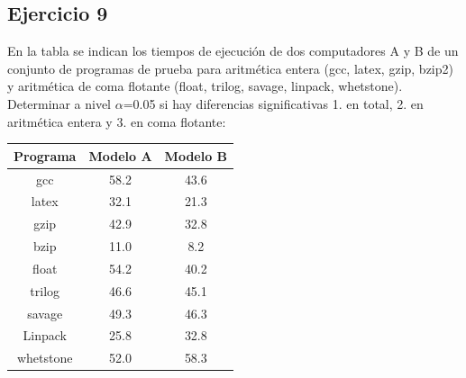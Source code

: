\subsection{Ejercicio 9}
\noindent
En la tabla se indican los tiempos de ejecución de dos computadores A y B de un conjunto de programas de prueba para aritmética entera (gcc, latex, gzip, bzip2) y aritmética de coma flotante (float, trilog, savage, linpack, whetstone). Determinar a nivel $\alpha$=0.05 si hay diferencias significativas 1. en total, 2. en aritmética entera y 3. en coma flotante:
\begin{table}[H]
\centering
\begin{tabular}{|c|c|c|}
\hline
\textbf{Programa} & \textbf{Modelo A} & \textbf{Modelo B} \\ \hline
gcc               & 58.2              & 43.6              \\ \hline
latex             & 32.1              & 21.3              \\ \hline
gzip              & 42.9              & 32.8              \\ \hline
bzip              & 11.0              & 8.2               \\ \hline
float             & 54.2              & 40.2              \\ \hline
trilog            & 46.6              & 45.1              \\ \hline
savage            & 49.3              & 46.3              \\ \hline
Linpack           & 25.8              & 32.8              \\ \hline
whetstone         & 52.0              & 58.3              \\ \hline
\end{tabular}
\end{table}
